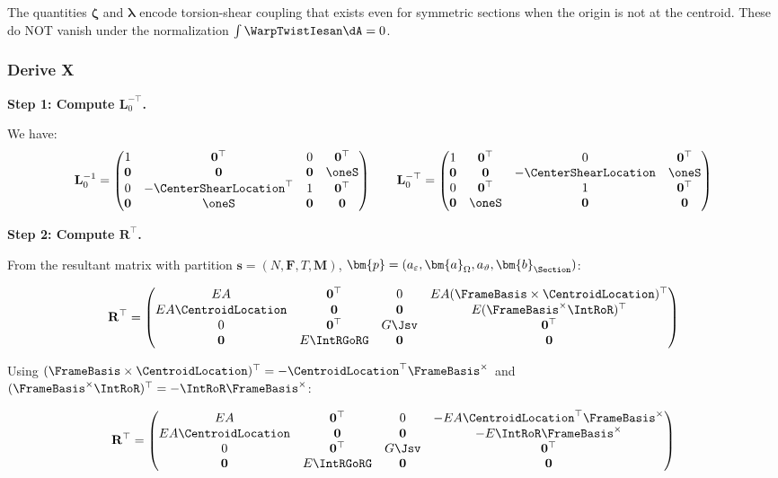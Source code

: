 The quantities \(\bm{\zeta}\) and \(\bm{\lambda}\) encode torsion-shear
coupling that exists even for symmetric sections when the origin is not
at the centroid. These do NOT vanish under the normalization
\(\int \WarpTwistIesan \dA = 0\).

\subsubsection{Derive X}

\textbf{Step 1: Compute \(\mathbf{L}_0^{-\top}\).}

We have: \[\mathbf{L}_0^{-1} = \begin{pmatrix}
1 & \mathbf{0}^\top & 0 & \mathbf{0}^\top \\
\mathbf{0} & \mathbf{0} & \mathbf{0} & \oneS \\
0 & -\CenterShearLocation^\top & 1 & \mathbf{0}^\top \\
\mathbf{0} & \oneS & \mathbf{0} & \mathbf{0}
\end{pmatrix}
\qquad
\mathbf{L}_0^{-\top} = \begin{pmatrix}
1 & \mathbf{0}^\top & 0 & \mathbf{0}^\top \\
\mathbf{0} & \mathbf{0} & -\CenterShearLocation & \oneS \\
0 & \mathbf{0}^\top & 1 & \mathbf{0}^\top \\
\mathbf{0} & \oneS & \mathbf{0} & \mathbf{0}
\end{pmatrix}\]

\textbf{Step 2: Compute \(\mathbf{R}^\top\).}

From the resultant matrix with partition
\(\bm{s} = (N, \bm{F}, T, \bm{M})\),
\(\bm{p} = (a_\varepsilon, \bm{a}_\Omega, a_\vartheta, \bm{b}_{\Section})\):

\[\mathbf{R}^\top = \begin{pmatrix}
EA & \mathbf{0}^\top & 0 & EA(\FrameBasis\times\CentroidLocation)^\top \\
EA\CentroidLocation & \mathbf{0} & \mathbf{0} & E(\FrameBasis^\times\IntRoR)^\top \\
0 & \mathbf{0}^\top & G\Jsv & \mathbf{0}^\top \\
\mathbf{0} & E\IntRGoRG & \mathbf{0} & \mathbf{0}
\end{pmatrix}\]

Using
\((\FrameBasis\times\CentroidLocation)^\top = -\CentroidLocation^\top\FrameBasis^\times\)
and \((\FrameBasis^\times\IntRoR)^\top = -\IntRoR\FrameBasis^\times\):

\[\mathbf{R}^\top = \begin{pmatrix}
EA & \mathbf{0}^\top & 0 & -EA\CentroidLocation^\top\FrameBasis^\times \\
EA\CentroidLocation & \mathbf{0} & \mathbf{0} & -E\IntRoR\FrameBasis^\times \\
0 & \mathbf{0}^\top & G\Jsv & \mathbf{0}^\top \\
\mathbf{0} & E\IntRGoRG & \mathbf{0} & \mathbf{0}
\end{pmatrix}
\]


